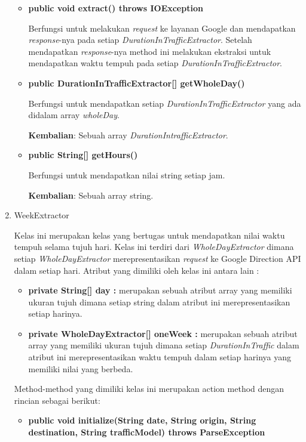 \begin{enumerate}
\begin{itemize}
		\item \textbf{public void extract() throws IOException}
		
		Berfungsi untuk melakukan \textit{request} ke layanan Google dan mendapatkan \textit{response}-nya pada setiap \textit{DurationInTrafficExtractor}. Setelah mendapatkan \textit{response}-nya method ini melakukan ekstraksi untuk mendapatkan waktu tempuh pada setiap \textit{DurationInTrafficExtractor}.
		
		\item \textbf{public DurationInTrafficExtractor[] getWholeDay()}
		
		Berfungsi untuk mendapatkan setiap \textit{DurationInTrafficExtractor} yang ada didalam array \textit{wholeDay}.
		
	\textbf{Kembalian}: Sebuah array \textit{DurationIntrafficExtractor}.
		
		\item \textbf{public String[] getHours()}
			
			Berfungsi untuk mendapatkan nilai string setiap jam.
		
	\textbf{Kembalian}: Sebuah array string.
	\end{itemize}
	
	
	\item WeekExtractor
	
	Kelas ini merupakan kelas yang bertugas untuk mendapatkan nilai waktu tempuh selama tujuh hari. Kelas ini terdiri dari \textit{WholeDayExtractor} dimana setiap \textit{WholeDayExtractor} merepresentasikan \textit{request} ke Google Direction API dalam setiap hari. Atribut yang dimiliki oleh kelas ini antara lain :
	
	\begin{itemize}
		\item \textbf{private String[] day :} merupakan sebuah atribut array yang memiliki ukuran tujuh dimana setiap string dalam atribut ini merepresentasikan setiap harinya.
		\item \textbf{private WholeDayExtractor[] oneWeek :} merupakan sebuah atribut array yang memiliki ukuran tujuh dimana setiap \textit{DurationInTraffic} dalam atribut ini merepresentasikan waktu tempuh dalam setiap harinya yang memiliki nilai yang berbeda.
	\end{itemize}
	
	Method-method yang dimiliki kelas ini merupakan action method dengan rincian sebagai berikut:
	
	\begin{itemize}
		\item \textbf{public void initialize(String date, String origin, String destination, String trafficModel) throws ParseException}
		

\end{itemize}
\end{enumerate}
